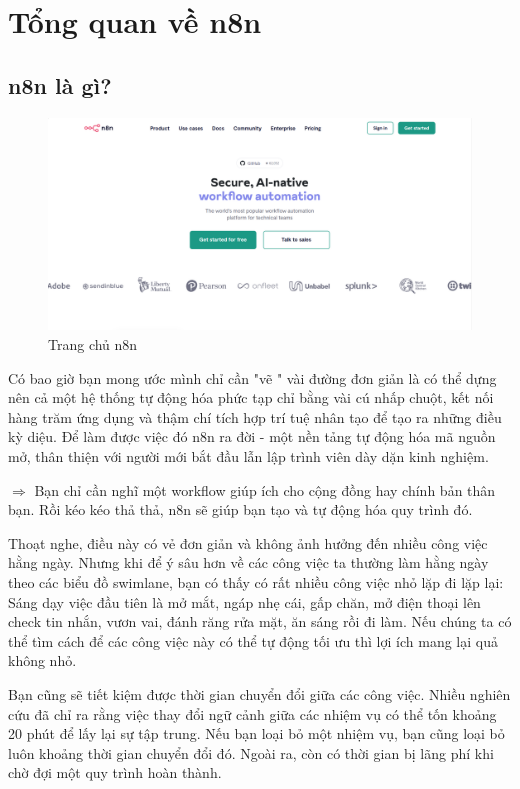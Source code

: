 \chapter{Tổng quan về n8n}

\section{n8n là gì?}

\begin{figure}[htbp]
    \centering
    \includegraphics[width=1\linewidth]{images/n8n.png}
    \caption{Trang chủ n8n}
\end{figure}

Có bao giờ bạn mong ước mình chỉ cần "vẽ " vài đường đơn giản là có thể dựng nên cả một hệ thống tự động hóa phức tạp chỉ bằng vài cú nhấp chuột, kết nối hàng trăm ứng dụng và thậm chí tích hợp trí tuệ nhân tạo để tạo ra những điều kỳ diệu. Để làm được việc đó n8n ra đời - một nền tảng tự động hóa mã nguồn mở, thân thiện với người mới bắt đầu lẫn lập trình viên dày dặn kinh nghiệm. 

$\Rightarrow$ Bạn chỉ cần nghĩ một workflow giúp ích cho cộng đồng hay chính bản thân bạn. Rồi kéo kéo thả thả, n8n sẽ giúp bạn tạo và tự động hóa quy trình đó.

\newpage
Thoạt nghe, điều này có vẻ đơn giản và không ảnh hưởng đến nhiều công việc hằng ngày. Nhưng khi để ý sâu hơn về các công việc ta thường làm hằng ngày theo các biểu đồ swimlane, bạn có thấy có rất nhiều công việc nhỏ lặp đi lặp lại: Sáng dạy việc đầu tiên là mở mắt, ngáp nhẹ cái, gấp chăn, mở điện thoại lên check tin nhắn, vươn vai, đánh răng rửa mặt, ăn sáng rồi đi làm. Nếu chúng ta có thể tìm cách để các công việc này có thể tự động tối ưu thì lợi ích mang lại quả không nhỏ.

Bạn cũng sẽ tiết kiệm được thời gian chuyển đổi giữa các công việc. Nhiều nghiên cứu đã chỉ ra rằng việc thay đổi ngữ cảnh giữa các nhiệm vụ có thể tốn khoảng 20 phút để lấy lại sự tập trung. Nếu bạn loại bỏ một nhiệm vụ, bạn cũng loại bỏ luôn khoảng thời gian chuyển đổi đó. Ngoài ra, còn có thời gian bị lãng phí khi chờ đợi một quy trình hoàn thành.

